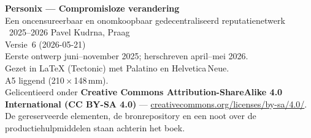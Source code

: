\thispagestyle{empty}
\ifdefined\printmode\vspace*{\fill}\else{}\fi
\begin{flushleft}\small\sffamily
\textbf{Personix --- Compromisloze verandering}\\[0.3em]
Een oncensureerbaar en onomkoopbaar gedecentraliseerd reputatienetwerk\\[1.4em]

\textcopyright\ 2025--2026 Pavel Kudrna, Praag\\[0.4em]

Versie~6 (2026-05-21)\\
Eerste ontwerp juni--november 2025; herschreven april--mei 2026.\\[1.4em]

Gezet in \LaTeX{} (Tectonic) met Palatino en Helvetica\,Neue.\\
A5 liggend (210\,$\times$\,148\,mm).\\[1.4em]

Gelicentieerd onder \textbf{Creative Commons Attribution-ShareAlike 4.0
International (CC BY-SA 4.0)} ---
\href{https://creativecommons.org/licenses/by-sa/4.0/}{creativecommons.org/licenses/by-sa/4.0/}.
De gereserveerde elementen, de bronrepository en een noot over de
productiehulpmiddelen staan achterin het boek.
\end{flushleft}
\ifdefined\printmode\else{}\fi
\clearpage
